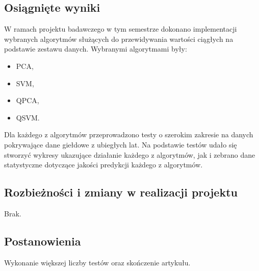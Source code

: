 \documentclass[polish,envcountsect,10pt]{article}
\begin{document}
\subsection{Osiągnięte wyniki}
W ramach projektu badawczego w tym semestrze dokonano implementacji wybranych algorytmów służących do przewidywania wartości ciągłych na podstawie zestawu danych.
Wybranymi algorytmami były:
\begin{itemize}
	\item PCA,
	\item SVM,
	\item QPCA,
	\item QSVM.
\end{itemize}
Dla każdego z algorytmów przeprowadzono testy o szerokim zakresie na danych pokrywające dane giełdowe z ubiegłych lat. 
Na podstawie testów udało się stworzyć wykresy ukazujące działanie każdego z algorytmów, jak i zebrano dane statystyczne dotyczące jakości predykcji każdego z algorytmów.
\subsection{Rozbieżności i zmiany w realizacji projektu}
Brak.
\subsection{Postanowienia}
Wykonanie większej liczby testów oraz skończenie artykułu.
\end{document}
